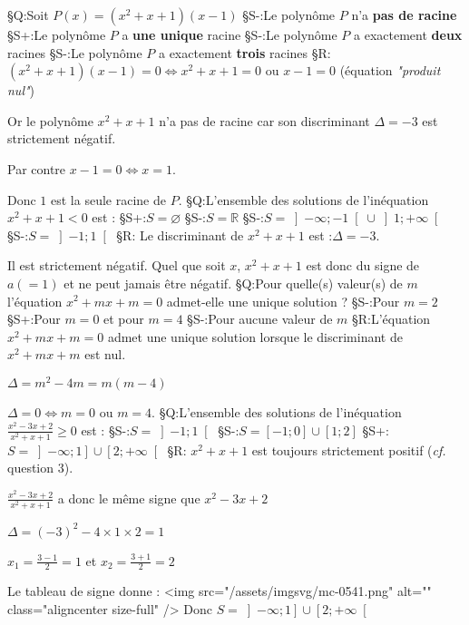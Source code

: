 §Q:Soit $P\left(x\right)=\left(x^{2}+x+1\right)\left(x-1\right)$
§S-:Le polynôme $P$ n'a \textbf{pas de racine}
§S+:Le polynôme $P$ a \textbf{une unique} racine
§S-:Le polynôme $P$ a exactement \textbf{deux} racines
§S-:Le polynôme $P$ a exactement \textbf{trois} racines
§R: $\left(x^{2}+x+1\right)\left(x-1\right)=0  \Leftrightarrow   x^{2}+x+1 = 0 $ ou $x-1=0$ (équation \textit{"produit nul"})
\par
Or le polynôme $x^{2}+x+1$ n'a pas de racine car son discriminant $\Delta  = -3$ est strictement négatif.
\par
Par contre $x-1=0 \Leftrightarrow  x=1$.
\par
Donc $1$ est la seule racine de $P$.
§Q:L'ensemble des solutions de l'inéquation $x^{2}+x+1 < 0$ est :
§S+:$S=\varnothing$
§S-:$S=\mathbb{R}$
§S-:$S=\left]-\infty  ; -1\right[ \cup  \left]1 ; +\infty \right[$
§S-:$S=\left]-1 ; 1\right[$
§R:  Le discriminant de $x^{2}+x+1$ est :$\Delta  = -3$.
\par
Il est strictement négatif. Quel que soit $x$, $x^{2}+x+1$ est donc du signe de $a \left(=1\right)$ et ne peut jamais être négatif.
§Q:Pour quelle(s) valeur(s) de $m$ l'équation $x^{2}+mx+m=0$ admet-elle une unique solution ?
§S-:Pour $m=2$
§S+:Pour $m=0$ et pour $m=4$
§S-:Pour aucune valeur de $m$
§R:L'équation $x^{2}+mx+m=0$ admet une unique solution  lorsque le discriminant de $x^{2}+mx+m$ est nul.
\par
$\Delta  = m^{2} - 4m = m\left(m-4\right)$
\par
$\Delta  = 0  \Leftrightarrow  m=0 $ ou $ m=4$.
§Q:L'ensemble des solutions de l'inéquation $\frac{x^{2}-3x+2}{x^{2}+x+1} \geqslant  0$ est :
§S-:$S=\left]-1 ; 1\right[$
§S-:$S=\left[-1 ; 0\right] \cup  \left[1 ; 2\right]$
§S+:$S=\left]-\infty  ; 1\right] \cup  \left[2 ; +\infty \right[$
§R: $x^{2}+x+1$ est toujours strictement positif (\textit{cf.} question 3).
\par
$\frac{x^{2}-3x+2}{x^{2}+x+1}$ a donc le même signe que $x^{2}-3x+2$
\par
$\Delta  = \left(-3\right)^{2}-4\times 1\times 2=1$
\par
$x_{1}=\frac{3-1}{2}=1$ et $x_{2}=\frac{3+1}{2}=2$
\par
Le tableau de signe donne :
<img src="/assets/imgsvg/mc-0541.png" alt="" class="aligncenter size-full" />
Donc $S=\left]-\infty  ; 1\right] \cup  \left[2 ; +\infty \right[$
